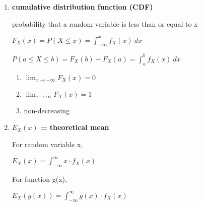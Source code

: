 \documentclass{article}
\begin{document}
\begin{small}
\begin{multicols}{2}
\begin{enumerate}
\item\textbf{cumulative distribution function (CDF)}

probability that a random variable is less than or equal to x

$F_X(x) = P(X \leq x) = \int_{-\infty}^{x} f_X(x) \ dx$ 

$P(a \le X \le b) = F_X(b) - F_X(a) = \int_{a}^{b} f_X(x) \ dx$

\begin{enumerate}
\item $\lim_{x\to-\infty} F_X(x) = 0$
\item $\lim_{x\to\infty} F_X(x) = 1$
\item non-decreasing
\end{enumerate}

\item\textbf{$E_X(x)$ = theoretical mean}

For random variable x, 

$E_X(x) = \int_{-\infty}^{\infty} x \cdot f_X(x)$

For function g(x), 

$E_X(g(x)) = \int_{-\infty}^{\infty} g(x) \cdot f_X(x)$

\end{enumerate}

\end{multicols}

\pagebreak


\end{small}
\end{document}
